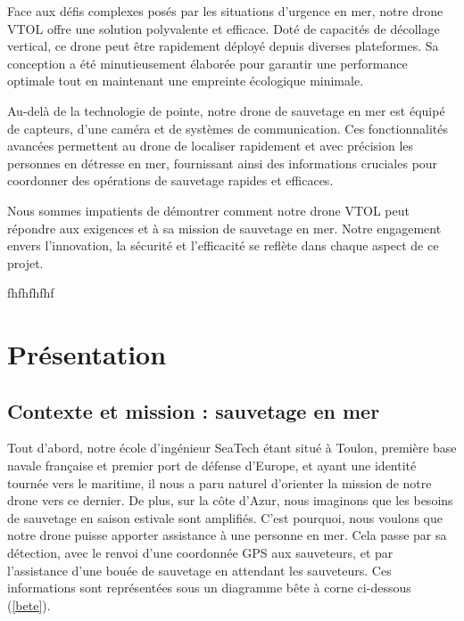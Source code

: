 \documentclass[a4paper,12pt,french]{report}
\begin{document}
Face aux défis complexes posés par les situations d'urgence en mer, notre drone VTOL offre une solution polyvalente et efficace. Doté de capacités de décollage vertical, ce drone peut être rapidement déployé depuis diverses plateformes. Sa conception a été minutieusement élaborée pour garantir une performance optimale tout en maintenant une empreinte écologique minimale.\newline

Au-delà de la technologie de pointe, notre drone de sauvetage en mer est équipé de capteurs, d’une caméra et de systèmes de communication. Ces fonctionnalités avancées permettent au drone de localiser rapidement et avec précision les personnes en détresse en mer, fournissant ainsi des informations cruciales pour coordonner des opérations de sauvetage rapides et efficaces.\newline

Nous sommes impatients de démontrer comment notre drone VTOL peut répondre aux exigences et à sa mission de sauvetage en mer. Notre engagement envers l'innovation, la sécurité et l'efficacité se reflète dans chaque aspect de ce projet.

fhfhfhfhf
\chapter{Présentation}

\section{Contexte et mission : sauvetage en mer}

Tout d'abord, notre école d'ingénieur SeaTech étant situé à Toulon, première base navale française et premier port de défense d'Europe, et ayant une identité tournée vers le maritime, il nous a paru naturel d'orienter la mission de notre drone vers ce dernier. De plus, sur la côte d'Azur, nous imaginons que les besoins de sauvetage en saison estivale sont amplifiés. C'est pourquoi, nous voulons que notre drone puisse apporter assistance à une personne en mer. Cela passe par sa détection, avec le renvoi d'une coordonnée GPS aux sauveteurs, et par l'assistance d'une bouée de sauvetage en attendant les sauveteurs. Ces informations sont représentées sous un diagramme bête à corne ci-dessous (\ref{bete}).
\bigskip
\end{document}
